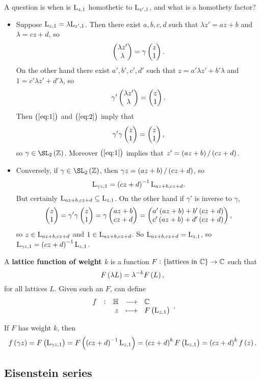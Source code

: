 A question is when is $ \mathrm{L}_{z, 1} $ homothetic to $ \mathrm{L}_{z', 1} $, and what is a homothety factor?
\begin{itemize}
\item Suppose $ \mathrm{L}_{z, 1} = \lambda \mathrm{L}_{z', 1} $. Then there exist $ a, b, c, d $ such that $ \lambda z' = az + b $ and $ \lambda = cz + d $, so
\begin{equation}
\label{eq:1}
\begin{pmatrix} \lambda z' \\ \lambda \end{pmatrix} = \gamma\begin{pmatrix} z \\ 1 \end{pmatrix}.
\end{equation}
On the other hand there exist $ a', b', c', d' $ such that $ z = a'\lambda z' + b'\lambda $ and $ 1 = c'\lambda z' + d'\lambda $, so
\begin{equation}
\label{eq:2}
\gamma'\begin{pmatrix} \lambda z' \\ \lambda \end{pmatrix} = \begin{pmatrix} z \\ 1 \end{pmatrix}.
\end{equation}
Then $ \br{\ref{eq:1}} $ and $ \br{\ref{eq:2}} $ imply that
$$ \gamma'\gamma\begin{pmatrix} z \\ 1 \end{pmatrix} = \begin{pmatrix} z \\ 1 \end{pmatrix}, $$
so $ \gamma \in \SL_2\br{\ZZ} $. Moreover $ \br{\ref{eq:1}} $ implies that $ z' = \br{az + b} / \br{cz + d} $.
\item Conversely, if $ \gamma \in \SL_2\br{\ZZ} $, then $ \gamma z = \br{az + b} / \br{cz + d} $, so
$$ \L_{\gamma z, 1} = \br{cz + d}^{-1}\L_{az + b, cz + d}. $$
But certainly $ \mathrm{L}_{az + b, cz + d} \subseteq \mathrm{L}_{z, 1} $. On the other hand if $ \gamma' $ is inverse to $ \gamma $,
$$ \twobyone{z}{1} = \gamma'\gamma\twobyone{z}{1} = \gamma\twobyone{az + b}{cz + d} = \twobyone{a'\br{az + b} + b'\br{cz + d}}{c'\br{az + b} + d'\br{cz + d}}, $$
so $ z \in \mathrm{L}_{az + b, cz + d} $ and $ 1 \in \mathrm{L}_{az + b, cz + d} $. So $ \mathrm{L}_{az + b, cz + d} = \mathrm{L}_{z, 1} $, so $ \L_{\gamma z, 1} = \br{cz + d}^{-1}\L_{z, 1} $.
\end{itemize}

\begin{definition}
A \textbf{lattice function of weight $ k $} is a function $ F : \cbr{\text{lattices in} \ \CC} \to \CC $ such that
$$ F\br{\lambda L} = \lambda^{-k}F\br{L}, $$
for all lattices $ L $. Given such an $ F $, can define
$$ \function[f]{\HH}{\CC}{z}{F\br{\L_{z, 1}}}. $$
\end{definition}

If $ F $ has weight $ k $, then
$$ f\br{\gamma z} = F\br{\L_{\gamma z, 1}} = F\br{\br{cz + d}^{-1}\L_{z, 1}} = \br{cz + d}^kF\br{\L_{z, 1}} = \br{cz + d}^kf\br{z}. $$

\pagebreak

\subsection{Eisenstein series}

